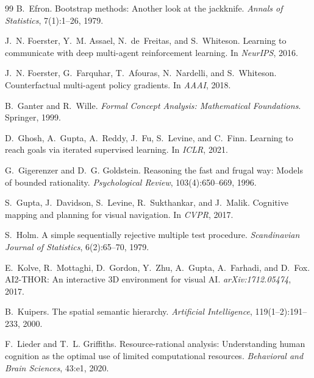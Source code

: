 \documentclass{article}
\begin{document}
\begin{thebibliography}{99}
B.~Efron.
\newblock Bootstrap methods: Another look at the jackknife.
\newblock \emph{Annals of Statistics}, 7(1):1--26, 1979.

J.~N. Foerster, Y.~M. Assael, N.~de~Freitas, and S.~Whiteson.
\newblock Learning to communicate with deep multi-agent reinforcement learning.
\newblock In \emph{NeurIPS}, 2016.

J.~N. Foerster, G.~Farquhar, T.~Afouras, N.~Nardelli, and S.~Whiteson.
\newblock Counterfactual multi-agent policy gradients.
\newblock In \emph{AAAI}, 2018.

B.~Ganter and R.~Wille.
\newblock \emph{Formal Concept Analysis: Mathematical Foundations}.
\newblock Springer, 1999.

D.~Ghosh, A.~Gupta, A.~Reddy, J.~Fu, S.~Levine, and C.~Finn.
\newblock Learning to reach goals via iterated supervised learning.
\newblock In \emph{ICLR}, 2021.

G.~Gigerenzer and D.~G. Goldstein.
\newblock Reasoning the fast and frugal way: Models of bounded rationality.
\newblock \emph{Psychological Review}, 103(4):650--669, 1996.

S.~Gupta, J.~Davidson, S.~Levine, R.~Sukthankar, and J.~Malik.
\newblock Cognitive mapping and planning for visual navigation.
\newblock In \emph{CVPR}, 2017.

S.~Holm.
\newblock A simple sequentially rejective multiple test procedure.
\newblock \emph{Scandinavian Journal of Statistics}, 6(2):65--70, 1979.

E.~Kolve, R.~Mottaghi, D.~Gordon, Y.~Zhu, A.~Gupta, A.~Farhadi, and D.~Fox.
\newblock AI2-THOR: An interactive 3D environment for visual AI.
\newblock \emph{arXiv:1712.05474}, 2017.

B.~Kuipers.
\newblock The spatial semantic hierarchy.
\newblock \emph{Artificial Intelligence}, 119(1--2):191--233, 2000.

F.~Lieder and T.~L. Griffiths.
\newblock Resource-rational analysis: Understanding human cognition as the optimal use of limited computational resources.
\newblock \emph{Behavioral and Brain Sciences}, 43:e1, 2020.


\end{thebibliography}
\end{document}
